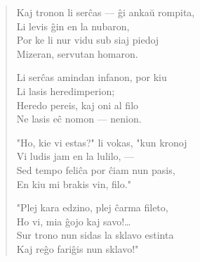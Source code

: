 \begin{verse}
                  \vin   Kaj tronon li ser\^cas --- \^gi anka\u u rompita,\\
                  Li levis \^gin en la nubaron,\\
                  Por ke li nur vidu sub siaj piedoj\\
                  Mizeran, servutan homaron.

                  \vin   Li ser\^cas amindan infanon, por kiu\\
                  Li lasis heredimperion;\\
                  Heredo pereis, kaj oni al filo\\
                  Ne lasis e\^c nomon --- nenion.

                  \vin   "Ho, kie vi estas?" li vokas, "kun kronoj\\
                  Vi ludis jam en la lulilo, ---\\
                  Sed tempo feli\^ca por \^ciam nun pasis,\\
                  En kiu mi brakis vin, filo."

                  \vin   "Plej kara edzino, plej \^carma fileto,\\
                  Ho vi, mia \^gojo kaj savo!\dots\\
                  Sur trono nun sidas la sklavo estinta\\
                  Kaj re\^go fari\^gis nun sklavo!"

\end{verse}

\smallrule{}
